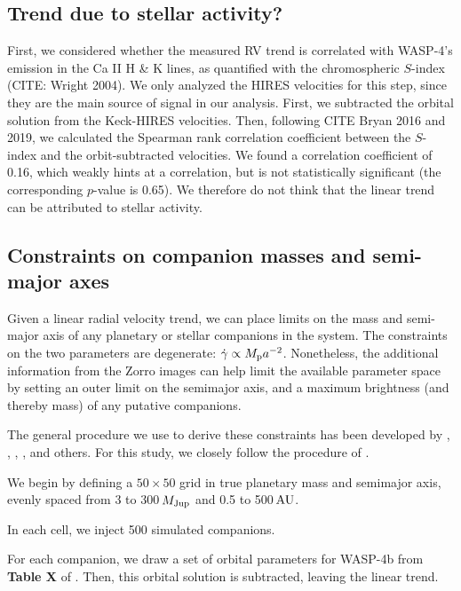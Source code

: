 \documentclass[RNAAS]{aastex62}
\begin{document}
\subsection{Trend due to stellar activity?}

First, we considered whether the measured RV trend is correlated with
WASP-4's emission in the Ca II H \& K lines, as quantified with the
chromospheric $S$-index (CITE: Wright 2004).  We only analyzed the
HIRES velocities for this step, since they are the main source of
signal in our analysis.  First, we subtracted the orbital solution
from the Keck-HIRES velocities.  Then, following CITE Bryan 2016 and
2019, we calculated the Spearman rank correlation coefficient between
the $S$-index and the orbit-subtracted velocities.  We found a
correlation coefficient of 0.16, which weakly hints at a correlation,
but is not statistically significant (the corresponding $p$-value is
0.65).  We therefore do not think that the linear trend can be
attributed to stellar activity.

\subsection{Constraints on companion masses and semi-major axes}

Given a linear radial velocity trend, we can place limits on the mass
and semi-major axis of any planetary or stellar companions in the
system.
The constraints on the two parameters are degenerate: $\dot{\gamma}
\propto M_{\rm p} a^{-2}$.
Nonetheless, the additional information from the Zorro images can help
limit the available parameter space by setting an outer limit on the
semimajor axis, and a maximum brightness (and thereby mass) of any
putative companions.

The general procedure we use to derive these constraints has been developed by
\citet{wright_linear_trends_2007}, \citet{montet_trends_2014},
\citet{knutson_friends_2014}, \citet{bryan_statistics_2016,bryan_excess_2019},
and others.
For this study, we closely follow the procedure of \citet{bryan_excess_2019}.

We begin by defining a $50\times50$ grid in true planetary mass and
semimajor axis, evenly spaced from 3 to 300$\,$$M_{\rm Jup}$ and 0.5 to
500$\,$${\rm AU}$.

In each cell, we inject 500 simulated companions.

For each companion, we draw a set of orbital parameters for WASP-4b
from {\bf Table X} of \citet{bouma_wasp-4b_2019}.
Then, this orbital solution is subtracted, leaving the linear trend.
\end{document}

